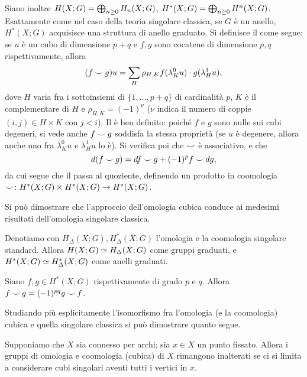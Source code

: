 Siano inoltre $H(X;G)=\bigoplus_{n\ge 0}H_n(X;G)$, $H^*(X;G)=\bigoplus_{n\ge 0}H^n(X;G)$. Esattamente come nel caso della teoria singolare classica, se $G$ è un anello, $H^*(X;G)$ acquisisce una struttura di anello graduato. Si definisce il \cupproduct{} come segue: se $u$ è un cubo di dimensione $p+q$ e $f,g$ sono cocatene di dimensione $p,q$ rispettivamente, allora
$$
(f\mathbin{\smile} g)u=\sum_H\rho_{H,K}f(\lambda^0_Ku)\cdot g(\lambda^1_Hu),
$$
dove $H$ varia fra i sottoinsiemi di $\{1,\ldots,p+q\}$ di cardinalità $p$, $K$ è il complementare di $H$ e $\rho_{H,K}=(-1)^\nu$ ($\nu$ indica il numero di coppie $(i,j)\in H\times K$ con $j<i$). Il \cupproduct{} è ben definito: poiché $f$ e $g$ sono nulle sui cubi degeneri, si vede anche $f\mathbin{\smile} g$ soddisfa la stessa proprietà (se $u$ è degenere, allora anche uno fra $\lambda^0_Ku$ e $\lambda^1_Hu$ lo è). Si verifica poi che $\mathbin{\smile}$ è associativo, e che
$$
d(f\mathbin{\smile} g)=df\mathbin{\smile} g+(-1)^pf\mathbin{\smile} dg,
$$
da cui segue che il \cupproduct{} passa al quoziente, definendo un prodotto in coomologia $\mathbin{\smile}\colon H^*(X;G)\times H^*(X;G)\to H^*(X;G)$.

Si può dimostrare che l'approccio dell'omologia cubica conduce ai medesimi risultati dell'omologia singolare classica.

\begin{proposition}
Denotiamo con $H_\Delta(X;G),H^*_\Delta(X;G)$ l'omologia e la coomologia singolare standard. Allora $H(X;G)\simeq H_\Delta(X;G)$ come gruppi graduati, e $H^*(X;G)\simeq H_\Delta^*(X;G)$ come anelli graduati.
\end{proposition}
\begin{corollary}
Siano $f,g\in H^*(X;G)$ rispettivamente di grado $p$ e $q$. Allora $f\mathbin{\smile} g=(-1)^{pq}g\mathbin{\smile} f$.
\end{corollary}
Studiando più esplicitamente l'isomorfismo fra l'omologia (e la coomologia) cubica e quella singolare classica si può dimostrare quanto segue.
\begin{proposition}
Supponiamo che $X$ sia connesso per archi; sia $x\in X$ un punto fissato. Allora i gruppi di omologia e coomologia (cubica)  di $X$ rimangono inalterati se ci si limita a considerare cubi singolari aventi tutti i vertici in $x$.
\end{proposition}

